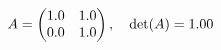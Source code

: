 \documentclass[preview]{standalone}
\begin{document}
\begin{align*}
\special{dvisvgm:raw <g id='unique000'>}A = \begin{pmatrix} 1.0 & 1.0 \\ 0.0 & 1.0 \end{pmatrix}, \quad \det(A) = 1.00\special{dvisvgm:raw </g>}
\end{align*}
\end{document}
